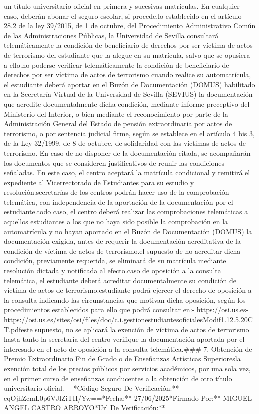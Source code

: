 \documentclass{article}
\begin{document}
\begin{itemize}
{un título universitario oficial en primera y sucesivas matrículas. En cualquier caso, deberán abonar el seguro escolar, si procede.\n\nConforme lo establecido en el artículo 28.2 de la ley 39/2015, de 1 de octubre, del Procedimiento Administrativo Común de las Administraciones Públicas, la Universidad de Sevilla consultará telemáticamente la condición de beneficiario de derechos por ser víctima de actos de terrorismo del estudiante que la alegue en su matrícula, salvo que se opusiera a ello.\n\nDe no poderse verificar telemáticamente la condición de beneficiario de derechos por ser víctima de actos de terrorismo cuando realice su automatrícula, el estudiante deberá aportar en el Buzón de Documentación (DOMUS) habilitado en la Secretaría Virtual de la Universidad de Sevilla (SEVIUS) la documentación que acredite documentalmente dicha condición, mediante informe preceptivo del Ministerio del Interior, o bien mediante el reconocimiento por parte de la Administración General del Estado de pensión extraordinaria por actos de terrorismo, o por sentencia judicial firme, según se establece en el artículo 4 bis 3, de la Ley 32/1999, de 8 de octubre, de solidaridad con las víctimas de actos de terrorismo. En caso de no disponer de la documentación citada, se acompañarán los documentos que se consideren justificativos de reunir las condiciones señaladas. En este caso, el centro aceptará la matrícula condicional y remitirá el expediente al Vicerrectorado de Estudiantes para su estudio y resolución.\n\nLas secretarías de los centros podrán hacer uso de la comprobación telemática, con independencia de la aportación de la documentación por el estudiante.\n\nEn todo caso, el centro deberá realizar las comprobaciones telemáticas a aquellos estudiantes a los que no haya sido posible la comprobación en la automatrícula y no hayan aportado en el Buzón de Documentación (DOMUS) la documentación exigida, antes de requerir la documentación acreditativa de la condición de víctima de actos de terrorismo.\n\nEn el supuesto de no acreditar dicha condición, previamente requerida, se eliminará de su matrícula mediante resolución dictada y notificada al efecto.\n\nEn caso de oposición a la consulta telemática, el estudiante deberá acreditar documentalmente su condición de víctima de actos de terrorismo.\n\nEl estudiante podrá ejercer el derecho de oposición a la consulta indicando las circunstancias que motivan dicha oposición, según los procedimientos establecidos para ello que podrá consultar en:\n\n- https://osi.us.es\n- https://osi.us.es/sites/osi/files/doc/c.i.gestionestudiantesoficialesModif1.12.5.20CT.pdf\n\nEn este supuesto, no se aplicará la exención de víctima de actos de terrorismo hasta tanto la secretaría del centro verifique la documentación aportada por el interesado en el acto de oposición a la consulta telemática.\n\n### 7. Obtención de Premio Extraordinario Fin de Grado o de Enseñanzas Artísticas Superiores la exención total de los precios públicos por servicios académicos, por una sola vez, en el primer curso de enseñanzas conducentes a la obtención de otro título universitario oficial.\n\n----\n\n**Código Seguro De Verificación:** eqOjhZcmL0p6VJlZiTH/Yw==\n**Fecha:** 27/06/2025\n**Firmado Por:** MIGUEL ANGEL CASTRO ARROYO\n**Url De Verificación:** }
\end{itemize}
\end{document}
